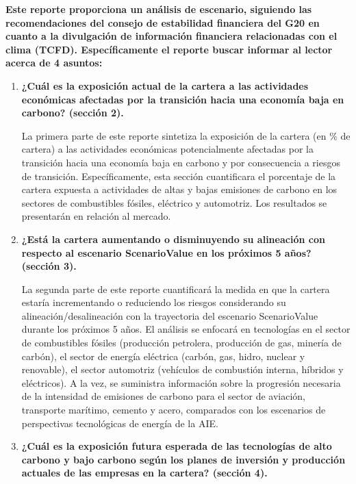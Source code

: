\documentclass[10pt,table]{article}\usepackage[]{graphicx}\usepackage[]{color}
\begin{document}
	\begin{multicols}{2}
		
		\textbf{Este reporte proporciona un análisis de escenario, siguiendo las recomendaciones del consejo de estabilidad financiera del G20 en cuanto a la divulgación de información financiera relacionadas con el clima (TCFD). Específicamente el reporte buscar informar al lector acerca de 4 asuntos: }
		
		\begin{enumerate}
			\item{\textbf{¿Cuál es la exposición actual de la cartera a las actividades económicas afectadas por la transición hacia una economía baja en carbono? (sección 2). }
			}
			
			La primera parte de este reporte sintetiza la exposición de la cartera (en \% de cartera) a las actividades económicas potencialmente afectadas por la transición hacia una economía baja en carbono y por consecuencia a riesgos de transición. Específicamente, esta sección cuantificara el porcentaje de la cartera expuesta a actividades de altas y bajas emisiones de carbono en los sectores de combustibles fósiles, eléctrico y automotriz. Los resultados se presentarán en relación al mercado.
			
			\item{\textbf{¿Está la cartera aumentando o disminuyendo su alineación con respecto al escenario ScenarioValue en los próximos 5 años? (sección 3).}
			}
			
			La segunda parte de este reporte cuantificará la medida en que la cartera estaría incrementando o reduciendo los riesgos considerando su alineación/desalineación con la trayectoria del escenario ScenarioValue durante los próximos 5 años. El análisis se enfocará en tecnologías en el sector de combustibles fósiles (producción petrolera, producción de gas, minería de carbón), el sector de energía eléctrica (carbón, gas, hidro, nuclear y renovable), el sector automotriz (vehículos de combustión interna, híbridos y eléctricos). A la vez, se suministra información sobre la progresión necesaria de la intensidad de emisiones de carbono para el sector de aviación, transporte marítimo, cemento y acero, comparados con los escenarios de perspectivas tecnológicas de energía de la AIE.
			
			
			
			\item{\textbf{¿Cuál es la exposición futura esperada de las tecnologías de alto carbono y bajo carbono según los planes de inversión y producción actuales de las empresas en la cartera? (sección 4).}
			}
			

\end{enumerate}
\end{multicols}
\end{document}
